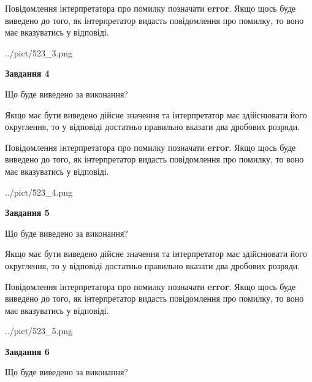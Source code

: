 \documentclass[12pt, ukrainian]{article}
\begin{document}
{\begin {Large}
Повідомлення інтерпретатора про помилку позначати \textbf{error}.
Якщо щось буде виведено до того, як інтерпретатор видасть повідомлення про помилку, 
то воно має вказуватись у відповіді. \par

\begin{center}
	{../pict/523_3.png}
\end{center}
\newpage

{\begin {center}\textbf{Завдання 4}\end {center}}\par
Що буде виведено за виконання? \par

Якщо має бути виведено дійсне значення та інтерпретатор має здійснювати його округлення, 
то у відповіді достатньо правильно вказати два дробових розряди.

Повідомлення інтерпретатора про помилку позначати \textbf{error}.
Якщо щось буде виведено до того, як інтерпретатор видасть повідомлення про помилку, 
то воно має вказуватись у відповіді. \par

\begin{center}
	{../pict/523_4.png}
\end{center}
\newpage

{\begin {center}\textbf{Завдання 5}\end {center}}\par
Що буде виведено за виконання? \par

Якщо має бути виведено дійсне значення та інтерпретатор має здійснювати його округлення, 
то у відповіді достатньо правильно вказати два дробових розряди.

Повідомлення інтерпретатора про помилку позначати \textbf{error}.
Якщо щось буде виведено до того, як інтерпретатор видасть повідомлення про помилку, 
то воно має вказуватись у відповіді. \par

\begin{center}
	{../pict/523_5.png}
\end{center}
\newpage

{\begin {center}\textbf{Завдання 6}\end {center}}\par
Що буде виведено за виконання? \par


\end{Large}}
\end{document}
